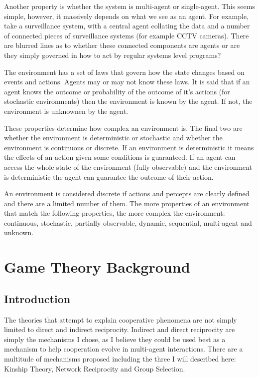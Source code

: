 \documentclass[]{final_report}
\begin{document}
Another property is whether the system is multi-agent or single-agent. This seems simple, however, it massively depends on what we see as an agent. For example, take a surveillance system, with a central agent collating the data and a number of connected pieces of surveillance systems (for example CCTV cameras). There are blurred lines as to whether these connected components are agents or are they simply governed in how to act by regular systems level programs?\par 
The environment has a set of laws that govern how the state changes based on events and actions. Agents may or may not know these laws. It is said that if an agent knows the outcome or probability of the outcome of it's actions (for stochastic environments) then the environment is known by the agent. If not, the environment is unknownen by the agent.\par 
These properties determine how complex an environment is. The final two are whether the environment is deterministic or stochastic and whether the environment is continuous or discrete. If an environment is deterministic it means the effects of an action given some conditions is guaranteed. If an agent can access the whole state of the environment (fully observable) and the environment is deterministic the agent can guarantee the outcome of their action.\par 
An environment is considered discrete if actions and percepts are clearly defined and there are a limited number of them. The more properties of an environment that match the following properties, the more complex the environment: continuous, stochastic, partially observable, dynamic, sequential, multi-agent and unknown.

\section{Game Theory Background}
\subsection{Introduction}
The theories that attempt to explain cooperative phenomena are not simply limited to direct and indirect reciprocity. Indirect and direct reciprocity are simply the mechanisms I chose, as I believe they could be used best as a mechanism to help cooperation evolve in multi-agent interactions. There are a multitude of mechanisms proposed including the three I will described here: Kinship Theory, Network Reciprocity and Group Selection.
\end{document}
